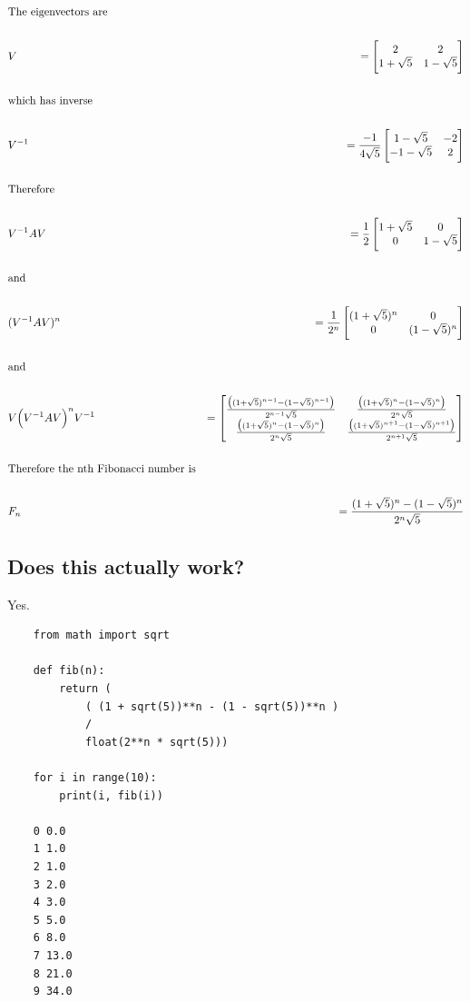\begin{align*}
&\text{The eigenvectors are}
\\\\
&V &= \begin{bmatrix}2           & 2          \\1 + \sqrt 5 & 1 - \sqrt 5\\ \end{bmatrix}
\\\\
&\text{which has inverse}
\\\\
&V^{-1} &= \frac{-1}{4\sqrt 5} \begin{bmatrix}1 - \sqrt 5  & -2\\-1 - \sqrt 5 & 2\\ \end{bmatrix}
\\\\
&\text{Therefore}
\\\\
&V^{-1}AV &= \frac{1}{2} \begin{bmatrix}1 + \sqrt 5 & 0          \\0           & 1 - \sqrt 5\\ \end{bmatrix}
\\\\
&\text{and}
\\\\
&(V^{-1}AV)^n &= \frac{1}{2^n} \begin{bmatrix}(1 + \sqrt 5)^n & 0          \\0                 & (1 - \sqrt 5)^n\\ \end{bmatrix}
\\\\
&\text{and}
\\\\
&V \Big(V^{-1}AV\Big)^n V^{-1} &=
\begin{bmatrix}\frac{\big((1 + \sqrt 5)^{n-1} - (1 - \sqrt 5)^{n-1}\big)}{2^{n-1}\sqrt 5} & \frac{\big((1 + \sqrt 5)^n     - (1 - \sqrt 5)^n    \big)}{2^n    \sqrt 5}\\\frac{\big((1 + \sqrt 5)^n     - (1 - \sqrt 5)^n    \big)}{2^n    \sqrt 5} & \frac{\big((1 + \sqrt 5)^{n+1} - (1 - \sqrt 5)^{n+1}\big)}{2^{n+1}\sqrt 5}\\ \end{bmatrix}
\\\\
&\text{Therefore the nth Fibonacci number is}
\\\\
&F_n &= \frac{(1 + \sqrt 5)^n     - (1 - \sqrt 5)^n}
             {2^n    \sqrt 5}
\end{align*}

\newpage
\subsection*{Does this actually work?}

Yes.

\begin{verbatim}
    from math import sqrt

    def fib(n):
        return (
            ( (1 + sqrt(5))**n - (1 - sqrt(5))**n )
            /
            float(2**n * sqrt(5)))

    for i in range(10):
        print(i, fib(i))

    0 0.0
    1 1.0
    2 1.0
    3 2.0
    4 3.0
    5 5.0
    6 8.0
    7 13.0
    8 21.0
    9 34.0
\end{verbatim}

